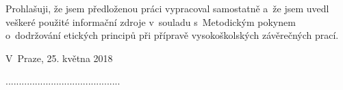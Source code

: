 \begin{declaration}

Prohlašuji, že jsem předloženou práci vypracoval samostatně a~že jsem uvedl veškeré použité informační zdroje v~souladu s~Metodickým pokynem o~dodržování etických principů při přípravě vysokoškolských závěrečných prací.

\medskip

V~Praze, 25. května 2018

\vspace*{.5cm}

...........................................



\end{declaration}
